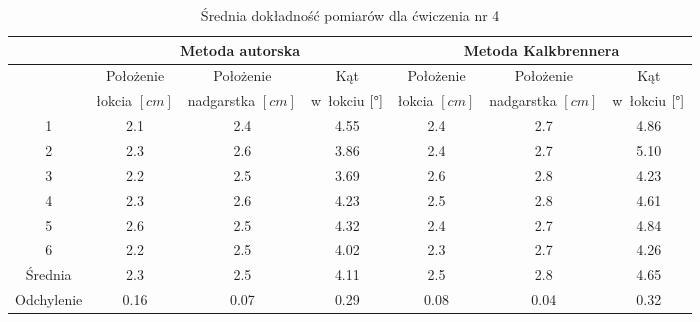 \begin{table}[!htb]
	\caption{Średnia dokładność pomiarów dla ćwiczenia nr 4}
	\label{tab:experiments:four:avg}
	\noindent
	\tiny
	\centering
	\begin{tabular}{|c|c|c|c|c|c|c|}
		\hline 
		& \multicolumn{3}{c|}{Metoda autorska} & \multicolumn{3}{c|}{Metoda Kalkbrennera}  \\ 
		\hline 
		           & Położenie    & Położenie       & Kąt                  & Położenie    & Położenie       & Kąt                  \\
		           & łokcia $[cm]$ & nadgarstka $[cm]$ & w~łokciu	$[\degree]$ & łokcia $[cm]$ & nadgarstka $[cm]$ & w~łokciu	$[\degree]$ \\
		\hline
		1          & 2.1            & 2.4               & 4.55                  & 2.4            & 2.7               & 4.86                  \\
		2          & 2.3            & 2.6               & 3.86                  & 2.4            & 2.7               & 5.10                  \\
		3          & 2.2            & 2.5               & 3.69                  & 2.6            & 2.8               & 4.23                  \\
		4          & 2.3            & 2.6               & 4.23                  & 2.5            & 2.8               & 4.61                  \\
		5          & 2.6            & 2.5               & 4.32                  & 2.4            & 2.7               & 4.84                  \\
		6          & 2.2            & 2.5               & 4.02                  & 2.3            & 2.7               & 4.26                  \\
		\hline
				
		Średnia   & 2.3            & 2.5               & 4.11                  & 2.5            & 2.8               & 4.65                  \\
		Odchylenie & 0.16           & 0.07              & 0.29                  & 0.08           & 0.04              & 0.32                  \\
		\hline
	\end{tabular} 
	
\end{table} 

